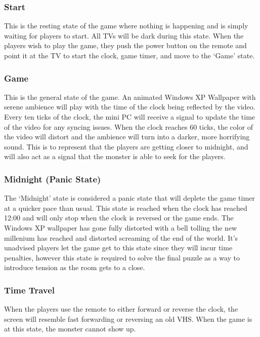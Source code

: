 \documentclass[conference]{IEEEtran}
\begin{document}
\subsubsection{Start}

\indent This is the resting state of the game where nothing is happening and is simply waiting for players to start. All TVs will be dark during this state.
When the players wish to play the game, they push the power button on the remote and point it at the TV to start the clock, game timer, and move to the `Game' state.

\subsubsection{Game}

\indent This is the general state of the game. An animated Windows XP Wallpaper with serene ambience will play with the time of the clock being reflected by the video.
Every ten ticks of the clock, the mini PC will receive a signal to update the time of the video for any syncing issues. When the clock reaches 60 ticks,
the color of the video will distort and the ambience will turn into a darker, more horrifying sound. This is to represent that the players are getting
closer to midnight, and will also act as a signal that the monster is able to seek for the players.

\subsubsection{Midnight (Panic State)}

\indent The `Midnight' state is considered a panic state that will deplete the game timer at a quicker pace than usual. This state is reached when
the clock has reached 12:00 and will only stop when the clock is reversed or the game ends. The Windows XP wallpaper has gone fully distorted with
a bell tolling the new millenium has reached and distorted screaming of the end of the world. It's unadvised players let the game get to this state
since they will incur time penalties, however this state is required to solve the final puzzle as a way to introduce tension as the room gets to a close.

\subsubsection{Time Travel}

\indent When the players use the remote to either forward or reverse the clock, the screen will resemble fast forwarding or reversing an old VHS. When
the game is at this state, the monster cannot show up.
\end{document}
